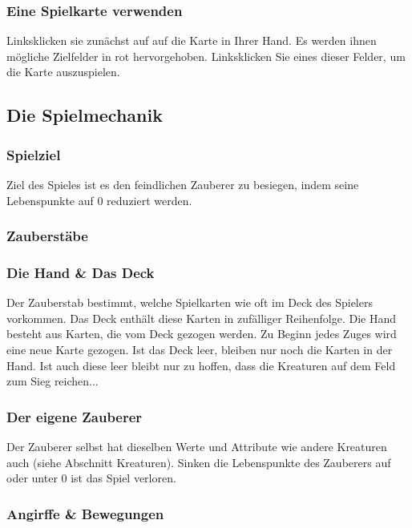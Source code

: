 \documentclass[a4paper,12pt]{scrartcl}
\begin{document}
	\subsubsection{Eine Spielkarte verwenden}
	Linksklicken sie zunächst auf auf die Karte in Ihrer Hand.
	Es werden ihnen mögliche Zielfelder in rot hervorgehoben.
	Linksklicken Sie eines dieser Felder, um die Karte auszuspielen.
	
	\subsection{Die Spielmechanik}
	\subsubsection{Spielziel}
	Ziel des Spieles ist es den feindlichen Zauberer zu besiegen, indem seine Lebenspunkte auf 0 reduziert werden.
	
	\subsubsection{Zauberstäbe}
	
	\subsubsection{Die Hand \& Das Deck}
	Der Zauberstab bestimmt, welche Spielkarten wie oft im Deck des Spielers vorkommen. Das Deck enthält diese Karten in zufälliger Reihenfolge.
	Die Hand besteht aus Karten, die vom Deck gezogen werden. Zu Beginn jedes Zuges wird eine neue Karte gezogen.
	Ist das Deck leer, bleiben nur noch die Karten in der Hand. Ist auch diese leer bleibt nur zu hoffen, dass die Kreaturen auf dem Feld zum Sieg reichen...
	
	\subsubsection{Der eigene Zauberer}
	Der Zauberer selbst hat dieselben Werte und Attribute wie andere Kreaturen auch (siehe Abschnitt \glqq Kreaturen\grqq\hspace{0.05em}). Sinken die Lebenspunkte des Zauberers auf oder unter 0 ist das Spiel verloren.
	
	\subsubsection{Angirffe \& Bewegungen}
\end{document}
